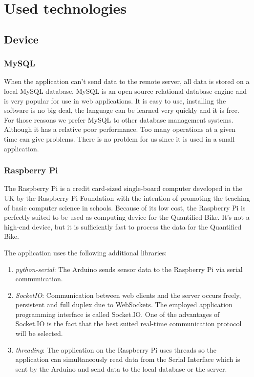 \section{Used technologies}
\subsection{Device}
\subsubsection{MySQL}
When the application can't send data to the remote server, all data is stored on a local MySQL database. MySQL is an open source relational database engine and is very popular for use in web applications. It is easy to use, installing the software is no big deal, the language can be learned very quickly and it is free. For those reasons we prefer MySQL to other database management systems. Although it has a relative poor performance. Too many operations at a given time can give problems. There is no problem for us since it is used in a small application.
\subsubsection{Raspberry Pi}
The Raspberry Pi is a credit card-sized single-board computer developed in the UK by the Raspberry Pi Foundation with the intention of promoting the teaching of basic computer science in schools.\cite{RaspberryWikipedia}
Because of its low cost, the Raspberry Pi is perfectly suited to be used as computing device for the Quantified Bike. 
It's not a high-end device, but it is sufficiently fast to process the data for the Quantified Bike.

The application uses the following additional libraries:
\begin{enumerate}
 \item \textit{python-serial}: The Arduino sends sensor data to the Raspberry Pi via serial communication.
 \item \textit{SocketIO}: Communication between web clients and the server occurs freely, persistent and full duplex due to WebSockets. The employed application programming interface is called Socket.IO. One of the advantages of Socket.IO is the fact that the best suited real-time communication protocol will be selected.
 \item \textit{threading}: The application on the Raspberry Pi uses threads so the application can simultaneously read data from the Serial Interface which is sent by the Arduino and send data to the local database or the server.
\end{enumerate}

